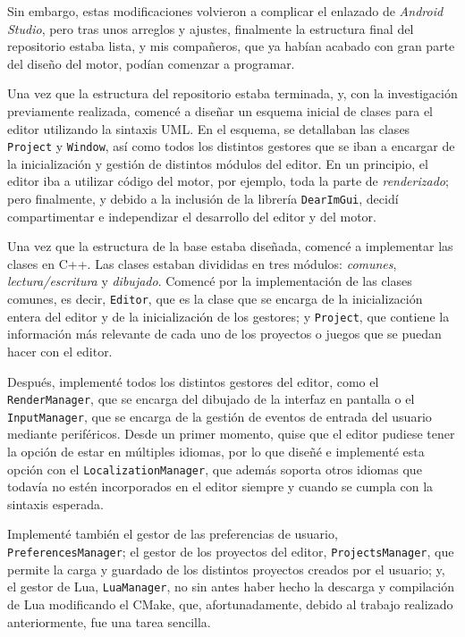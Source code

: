 \smallskip

Sin embargo, estas modificaciones volvieron a complicar el enlazado de \textit{Android Studio}, pero tras unos arreglos y ajustes, finalmente la estructura final del repositorio estaba lista, y mis compañeros, que ya habían acabado con gran parte del diseño del motor, podían comenzar a programar.

\medskip

Una vez que la estructura del repositorio estaba terminada, y, con la investigación previamente realizada, comencé a diseñar un esquema inicial de clases para el editor utilizando la sintaxis UML. En el esquema, se detallaban las clases \texttt{Project} y \texttt{Window}, así como todos los distintos gestores que se iban a encargar de la inicialización y gestión de distintos módulos del editor. En un principio, el editor iba a utilizar código del motor, por ejemplo, toda la parte de \textit{renderizado}; pero finalmente, y debido a la inclusión de la librería \texttt{DearImGui}, decidí compartimentar e independizar el desarrollo del editor y del motor.

\medskip

Una vez que la estructura de la base estaba diseñada, comencé a implementar las clases en C++. Las clases estaban divididas en tres módulos: \textit{comunes}, \textit{lectura/escritura} y \textit{dibujado}. Comencé por la implementación de las clases comunes, es decir, \texttt{Editor}, que es la clase que se encarga de la inicialización entera del editor y de la inicialización de los gestores; y \texttt{Project}, que contiene la información más relevante de cada uno de los proyectos o juegos que se puedan hacer con el editor.

\smallskip

Después, implementé todos los distintos gestores del editor, como el \texttt{RenderManager}, que se encarga del dibujado de la interfaz en pantalla o el \texttt{InputManager}, que se encarga de la gestión de eventos de entrada del usuario mediante periféricos. Desde un primer momento, quise que el editor pudiese tener la opción de estar en múltiples idiomas, por lo que diseñé e implementé esta opción con el \texttt{LocalizationManager}, que además soporta otros idiomas que todavía no estén incorporados en el editor siempre y cuando se cumpla con la sintaxis esperada.

\smallskip

Implementé también el gestor de las preferencias de usuario, \texttt{PreferencesManager}; el gestor de los proyectos del editor, \texttt{ProjectsManager}, que permite la carga y guardado de los distintos proyectos creados por el usuario; y, el gestor de Lua, \texttt{LuaManager}, no sin antes haber hecho la descarga y compilación de Lua modificando el CMake, que, afortunadamente, debido al trabajo realizado anteriormente, fue una tarea sencilla.

